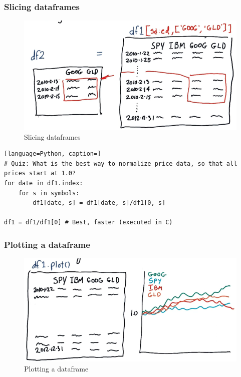 \documentclass[12pt]{article}
\begin{document}
\subsubsection{Slicing dataframes}
\begin{figure}[!ht]
\centering
\includegraphics[scale=0.45]{fig/fig5}
\caption{Slicing dataframes}
\end{figure}

\begin{lstlisting}[language=Python, caption=]
# Quiz: What is the best way to normalize price data, so that all prices start at 1.0?
for date in df1.index:
    for s in symbols:
        df1[date, s] = df1[date, s]/df1[0, s]

df1 = df1/df1[0] # Best, faster (executed in C)
\end{lstlisting}
 
\subsubsection{Plotting a dataframe}
\begin{figure}[!ht]
\centering
\includegraphics[scale=0.45]{fig/fig6}
\caption{Plotting a dataframe}
\end{figure}
\end{document}
